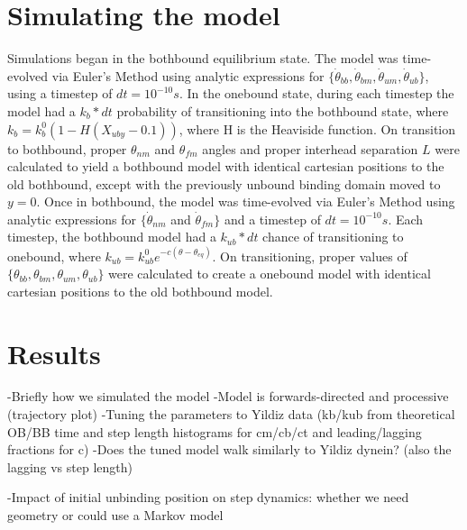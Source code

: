 \documentclass[9pt,twocolumn,twoside]{pnas-new}
\begin{document}
{  \section*{Simulating the model}
  Simulations began in the bothbound equilibrium state. The model was time-evolved via Euler's Method using analytic expressions for $\{\dot{\theta}_{bb}, \dot{\theta}_{bm}, \dot{\theta}_{um}, \dot{\theta}_{ub}\}$, using a timestep of $dt = 10^{-10}s$. In the onebound state, during each timestep the model had a $k_b*dt$ probability of transitioning into the bothbound state, where $k_b = k_b^0\left(1-H\left(X_{uby}-0.1\right)\right)$, where H is the Heaviside function. On transition to bothbound, proper $\theta_{nm}$ and $\theta_{fm}$ angles and proper interhead separation $L$ were calculated to yield a bothbound model with identical cartesian positions to the old bothbound, except with the previously unbound binding domain moved to $y=0$. Once in bothbound, the model was time-evolved via Euler's Method using analytic expressions for $\{\dot{\theta}_{nm}$ and $\dot{\theta}_{fm}\}$ and a timestep of $dt=10^{-10}s$. Each timestep, the bothbound model had a $k_{ub}*dt$ chance of transitioning to onebound, where $k_{ub} = k^0_{ub}e^{-c(\theta-\theta_{eq})}$. On transitioning, proper values of $\{\theta_{bb}, \theta_{bm}, \theta_{um}, \theta_{ub}\}$ were calculated to create a onebound model with identical cartesian positions to the old bothbound model.\\
}

\section{Results}
-Briefly how we simulated the model
-Model is forwards-directed and processive (trajectory plot)
-Tuning the parameters to Yildiz data (kb/kub from theoretical OB/BB time and step length histograms for cm/cb/ct and leading/lagging fractions for c)
-Does the tuned model walk similarly to Yildiz dynein? (also the lagging vs step length)


-Impact of initial unbinding position on step dynamics: whether we need geometry or could use a Markov model
\end{document}
